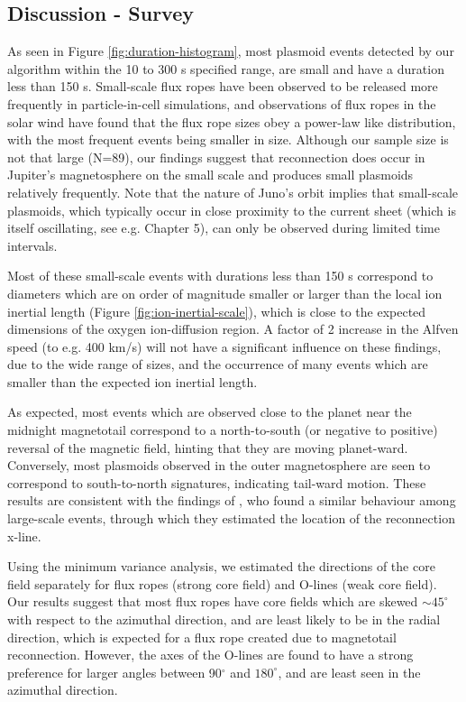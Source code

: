 \subsection{Discussion - Survey}

As seen in Figure \ref{fig:duration-histogram}, most plasmoid events detected by our algorithm within the 10 to 300 s specified range, are small and have a duration less than 150 s. Small-scale flux ropes have been observed to be released more frequently in particle-in-cell simulations, and observations of flux ropes in the solar wind have found that the flux rope sizes obey a power-law like distribution, with the most frequent events being smaller in size. Although our sample size is not that large (N=89), our findings suggest that reconnection does occur in Jupiter's magnetosphere on the small scale and produces small plasmoids relatively frequently. Note that the nature of Juno's orbit implies that small-scale plasmoids, which typically occur in close proximity to the current sheet (which is itself oscillating, see e.g. Chapter 5), can only be observed during limited time intervals.

Most of these small-scale events with durations less than 150 s correspond to diameters which are on order of magnitude smaller or larger than the local ion inertial length (Figure \ref{fig:ion-inertial-scale}), which is close to the expected dimensions of the oxygen ion-diffusion region. A factor of 2 increase in the Alfven speed (to e.g. 400 km/s) will not have a significant influence on these findings, due to the wide range of sizes, and the occurrence of many events which are smaller than the expected ion inertial length. 

As expected, most events which are observed close to the planet near the midnight magnetotail correspond to a north-to-south (or negative to positive) reversal of the magnetic field, hinting that they are moving planet-ward. Conversely, most plasmoids observed in the outer magnetosphere are seen to correspond to south-to-north signatures, indicating tail-ward motion. These results are consistent with the findings of , who found a similar behaviour among large-scale events, through which they estimated the location of the reconnection x-line. 

Using the minimum variance analysis, we estimated the directions of the core field separately for flux ropes (strong core field) and O-lines (weak core field). Our results suggest that most flux ropes have core fields which are skewed $\sim45^\circ$ with respect to the azimuthal direction, and are least likely to be in the radial direction, which is expected for a flux rope created due to magnetotail reconnection. However, the axes of the O-lines are found to have a strong preference for larger angles between 90$^\circ$ and $180^\circ$, and are least seen in the azimuthal direction. 

